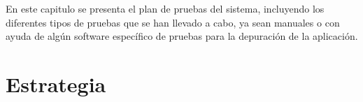

En este capitulo se presenta el plan de pruebas del sistema, incluyendo los diferentes tipos de pruebas que se han llevado a cabo, ya sean manuales o con ayuda de algún software específico de pruebas para la depuración de la aplicación.

\section{Estrategia}


